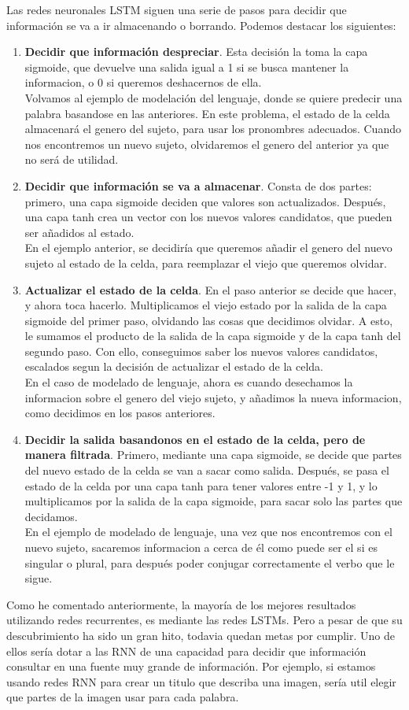 Las redes neuronales LSTM siguen una serie de pasos para decidir que información se va a ir almacenando o borrando. Podemos destacar los siguientes:
\begin{enumerate}
\item \textbf{Decidir que información despreciar}. Esta decisión la toma la capa sigmoide, que  devuelve una salida igual a 1 si se busca mantener la informacion, o 0 si queremos deshacernos de ella.\\
Volvamos al ejemplo de modelación del lenguaje, donde se quiere predecir una palabra basandose en las anteriores. En este problema, el estado de la celda almacenará el genero del sujeto, para usar los pronombres adecuados. Cuando nos encontremos un nuevo sujeto, olvidaremos el genero del anterior ya que no será de utilidad.
\item \textbf{Decidir que información se va a almacenar}. Consta de dos partes: primero, una capa sigmoide deciden que valores son actualizados. Después, una capa tanh crea un vector con los nuevos valores candidatos, que pueden ser añadidos al estado.\\
En el ejemplo anterior, se decidiría que queremos añadir el genero del nuevo sujeto al estado de la celda, para reemplazar el viejo que queremos olvidar.
\item \textbf{Actualizar el estado de la celda}. En el paso anterior se decide que hacer, y ahora toca hacerlo. Multiplicamos el viejo estado por la salida de la capa sigmoide del primer paso, olvidando las cosas que decidimos olvidar. A esto, le sumamos el producto de la salida de la capa sigmoide y de la capa tanh del segundo paso. Con ello, conseguimos saber los nuevos valores candidatos, escalados segun la decisión de actualizar el estado de la celda.\\
En el caso de modelado de lenguaje, ahora es cuando desechamos la informacion sobre el genero del viejo sujeto, y añadimos la nueva informacion, como decidimos en los pasos anteriores.
\item \textbf{Decidir la salida basandonos en el estado de la celda, pero de manera filtrada}. Primero, mediante una capa sigmoide, se decide que partes del nuevo estado de la celda se van a sacar como salida. Después, se pasa el estado de la celda por una capa tanh para tener valores entre -1 y 1, y lo multiplicamos por la salida de la capa sigmoide, para sacar solo las partes que decidamos.\\
En el ejemplo de modelado de lenguaje, una vez que nos encontremos con el nuevo sujeto, sacaremos informacion a cerca de él como puede ser el si es singular o plural, para después poder conjugar correctamente el verbo que le sigue.
\end{enumerate}
Como he comentado anteriormente, la mayoría de los mejores resultados utilizando redes recurrentes, es mediante las redes LSTMs. Pero a pesar de que su descubrimiento ha sido un gran hito, todavia quedan metas por cumplir. Uno de ellos sería dotar a las RNN de una capacidad para decidir que información consultar en una fuente muy grande de información. Por ejemplo, si estamos usando redes RNN para crear un titulo que describa una imagen, sería util elegir que partes de la imagen usar para cada palabra.
\label{ch:teoria} 